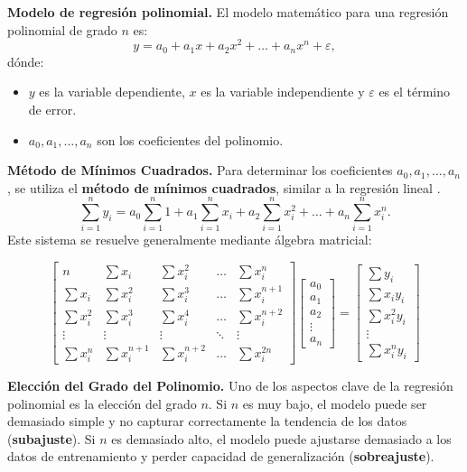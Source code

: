 \documentclass{article}
\begin{document}
\noindent \textbf{Modelo de regresión polinomial.}  
El modelo matemático para una regresión polinomial de grado $n$ es:
\begin{equation}
    y = a_0 + a_1 x + a_2 x^2 + \dots + a_n x^n + \varepsilon,
\end{equation}
dónde:
\begin{itemize}
    \item $y$ es la variable dependiente, $x$ es la variable independiente y $\varepsilon$ es el término de error.
    \item $a_0, a_1, \dots, a_n$ son los coeficientes del polinomio.
\end{itemize}

\noindent \textbf{Método de Mínimos Cuadrados.} Para determinar los coeficientes $a_0, a_1, \dots, a_n$, se utiliza el \textbf{método de mínimos cuadrados}, similar a la regresión lineal \cite{polinomico2}.
$$
    \sum_{i=1}^{n} y_i = a_0 \sum_{i=1}^{n} 1 + a_1 \sum_{i=1}^{n} x_i + a_2 \sum_{i=1}^{n} x_i^2 + \dots + a_n \sum_{i=1}^{n} x_i^n.
$$
Este sistema se resuelve generalmente mediante álgebra matricial:

\[
\begin{bmatrix}
    n & \sum x_i & \sum x_i^2 & \dots & \sum x_i^n \\
    \sum x_i & \sum x_i^2 & \sum x_i^3 & \dots & \sum x_i^{n+1} \\
    \sum x_i^2 & \sum x_i^3 & \sum x_i^4 & \dots & \sum x_i^{n+2} \\
    \vdots & \vdots & \vdots & \ddots & \vdots \\
    \sum x_i^n & \sum x_i^{n+1} & \sum x_i^{n+2} & \dots & \sum x_i^{2n}
\end{bmatrix}
\begin{bmatrix}
    a_0 \\ a_1 \\ a_2 \\ \vdots \\ a_n
\end{bmatrix}
=
\begin{bmatrix}
    \sum y_i \\ \sum x_i y_i \\ \sum x_i^2 y_i \\ \vdots \\ \sum x_i^n y_i
\end{bmatrix}
\]
\vspace{4mm}

\noindent \textbf{Elección del Grado del Polinomio.} Uno de los aspectos clave de la regresión polinomial es la elección del grado $n$. Si $n$ es muy bajo, el modelo puede ser demasiado simple y no capturar correctamente la tendencia de los datos (\textbf{subajuste}). Si $n$ es demasiado alto, el modelo puede ajustarse demasiado a los datos de entrenamiento y perder capacidad de generalización (\textbf{sobreajuste}).
\end{document}
